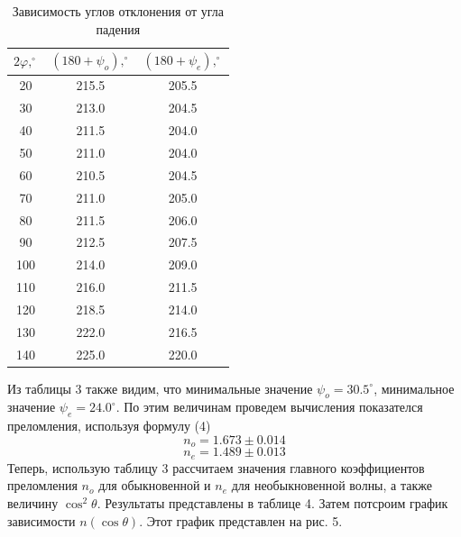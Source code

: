 \documentclass[a4paper,12pt]{article}
\begin{document}
\begin{table}[H]
    \centering
    \caption{Зависимость углов отклонения от угла падения}
    \begin{tabular}{|c|c|c|} \hline
        $2\varphi, ^\circ$ & $(180 + \psi_o), ^\circ$ & $(180 + \psi_e), ^\circ$ \\ \hline
        20 & 215.5 & 205.5 \\ \hline
        30 & 213.0 & 204.5 \\ \hline
        40 & 211.5 & 204.0 \\ \hline
        50 & 211.0 & 204.0 \\ \hline
        60 & 210.5 & 204.5 \\ \hline
        70 & 211.0 & 205.0 \\ \hline
        80 & 211.5 & 206.0 \\ \hline
        90 & 212.5 & 207.5 \\ \hline
        100 & 214.0 & 209.0 \\ \hline
        110 & 216.0 & 211.5 \\ \hline
        120 & 218.5 & 214.0 \\ \hline
        130 & 222.0 & 216.5 \\ \hline
        140 & 225.0 & 220.0 \\ \hline
    \end{tabular}
\end{table}

\newpage
\noindent Из таблицы 3 также видим, что минимальные значение $\psi_o = 30.5^\circ$, минимальное значение $\psi_e = 24.0^\circ$. По этим величинам проведем вычисления показателся преломления, используя формулу (4)
$$
n_o = 1.673 \pm 0.014
$$
$$
n_e = 1.489 \pm 0.013
$$
\noindent Теперь, использую таблицу 3 рассчитаем значения главного коэффициентов преломления $n_o$ для обыкновенной и $n_e$ для необыкновенной волны, а также величину $\cos^2\theta$. Результаты представлены в таблице 4. Затем потсроим график зависимости $n(\cos\theta)$. Этот график представлен на рис. 5.
\end{document}
